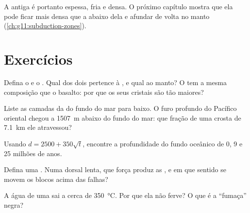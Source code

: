 A  antiga é portanto espessa, fria e densa. O próximo
capítulo mostra que ela pode ficar mais densa que a  abaixo dela
e afundar de volta no manto (\cref{ch:g11:subduction-zones}).

\section{Exercícios}

\begin{exercise}[$\star$]\label{exo:g11:ocean-ridges:1}
Defina o  e o . Qual dos dois pertence à , e
qual ao manto? O  tem a mesma composição que o basalto: por que os seus
cristais são tão maiores?
\end{exercise}

\begin{exercise}[$\star$]\label{exo:g11:ocean-ridges:2}
Liste as camadas da  do fundo do mar para baixo. O furo
profundo do Pacífico oriental chegou a \qty{1507}{m} abaixo do fundo do mar:
que fração de uma crosta de \qty{7.1}{km} ele atravessou?
\end{exercise}

\begin{exercise}[$\star$]\label{exo:g11:ocean-ridges:3}
Usando $d = 2500 + 350\sqrt{t}$, encontre a profundidade do fundo oceânico de
0, 9 e 25 milhões de anos.
\end{exercise}

\begin{exercise}[$\star$]\label{exo:g11:ocean-ridges:4}
Defina uma . Numa dorsal lenta, que força produz as , e em que sentido se movem os blocos acima das falhas?
\end{exercise}

\begin{exercise}[$\star$]\label{exo:g11:ocean-ridges:5}
A água de uma  sai a cerca de \qty{350}{\celsius}. Por que ela
não ferve? O que é a ``fumaça'' negra?
\end{exercise}

